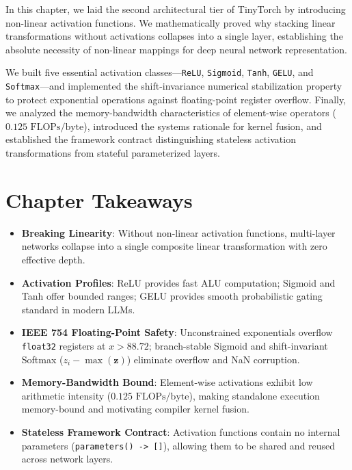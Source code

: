 \documentclass[
  letterpaper,
]{scrbook}
\providecommand{\tightlist}{%
  \setlength{\itemsep}{0pt}\setlength{\parskip}{0pt}}
\begin{document}
In this chapter, we laid the second architectural tier of TinyTorch by
introducing non-linear activation functions. We mathematically proved
why stacking linear transformations without activations collapses into a
single layer, establishing the absolute necessity of non-linear mappings
for deep neural network representation.

We built five essential activation classes---\texttt{ReLU},
\texttt{Sigmoid}, \texttt{Tanh}, \texttt{GELU}, and
\texttt{Softmax}---and implemented the shift-invariance numerical
stabilization property to protect exponential operations against
floating-point register overflow. Finally, we analyzed the
memory-bandwidth characteristics of element-wise operators
(\(0.125\text{ FLOPs/byte}\)), introduced the systems rationale for
kernel fusion, and established the framework contract distinguishing
stateless activation transformations from stateful parameterized layers.

\section{Chapter Takeaways}\label{chapter-takeaways-2}

\begin{itemize}
\tightlist
\item
  \textbf{Breaking Linearity}: Without non-linear activation functions,
  multi-layer networks collapse into a single composite linear
  transformation with zero effective depth.
\item
  \textbf{Activation Profiles}: ReLU provides fast ALU computation;
  Sigmoid and Tanh offer bounded ranges; GELU provides smooth
  probabilistic gating standard in modern LLMs.
\item
  \textbf{IEEE 754 Floating-Point Safety}: Unconstrained exponentials
  overflow \texttt{float32} registers at \(x > 88.72\); branch-stable
  Sigmoid and shift-invariant Softmax (\(z_i - \max(\mathbf{z})\))
  eliminate overflow and NaN corruption.
\item
  \textbf{Memory-Bandwidth Bound}: Element-wise activations exhibit low
  arithmetic intensity (\(0.125\text{ FLOPs/byte}\)), making standalone
  execution memory-bound and motivating compiler kernel fusion.
\item
  \textbf{Stateless Framework Contract}: Activation functions contain no
  internal parameters (\texttt{parameters()\ -\textgreater{}\ {[}{]}}),
  allowing them to be shared and reused across network layers.
\end{itemize}
\end{document}
